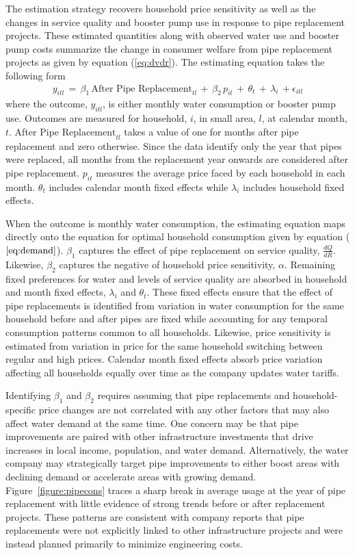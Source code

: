 \documentclass[12pt,table]{article}
\begin{document}
The estimation strategy recovers household price sensitivity as well as the changes in service quality and booster pump use in response to pipe replacement projects. These estimated quantities along with observed water use and booster pump costs summarize the change in consumer welfare from pipe replacement projects as given by equation (\ref{eq:dvdr}).  The estimating equation takes the following form
\begin{align}
\label{eq:esteq}
y_{itl} \,=\, \beta_1 \, \text{After Pipe Replacement}_{tl} \,+\, \beta_2 \, p_{it} \, + \, \theta_t \, + \, \lambda_i \, + \epsilon_{itl}
\end{align}
where the outcome, $y_{itl}$, is either monthly water consumption or booster pump use.  Outcomes are measured for household, $i$, in small area, $l$, at calendar month, $t$. After Pipe $\text{Replacement}_{tl} $ takes a value of one for months after pipe replacement and zero otherwise.  Since the data identify only the year that pipes were replaced, all months from the replacement year onwards are considered after pipe replacement. $p_{it}$ measures the average price faced by each household in each month. $\theta_t$ includes calendar month fixed effects while $\lambda_i$ includes household fixed effects.

When the outcome is monthly water consumption, the estimating equation maps directly onto the equation for optimal household consumption given by equation ($\ref{eq:demand}$).  $\beta_1$ captures the effect of pipe replacement on service quality, $\frac{dQ}{dR}$.  Likewise, $\beta_2$ captures the negative of household price sensitivity, $\alpha$.  Remaining fixed preferences for water and levels of service quality are absorbed in household and month fixed effects, $\lambda_i$ and $\theta_t$.  These fixed effects ensure that the effect of pipe replacements is identified from variation in water consumption for the same household before and after pipes are fixed while accounting for any temporal consumption patterns common to all households.  Likewise, price sensitivity is estimated from variation in price for the same household switching between regular and high prices.  Calendar month fixed effects absorb price variation affecting all households equally over time as the company updates water tariffs.  

Identifying $\beta_1$ and $\beta_2$ requires assuming that pipe replacements and household-specific price changes are not correlated with any other factors that may also affect water demand at the same time.  One concern may be that pipe improvements are paired with other infrastructure investments that drive increases in local income, population, and water demand.  Alternatively, the water company may strategically target pipe improvements to either boost areas with declining demand or accelerate areas with growing demand.  Figure~\ref{figure:pipecons} traces a sharp break in average usage at the year of pipe replacement with little evidence of strong trends before or after replacement projects.  These patterns are consistent with company reports that pipe replacements were not explicitly linked to other infrastructure projects and were instead planned primarily to minimize engineering costs.
\end{document}

